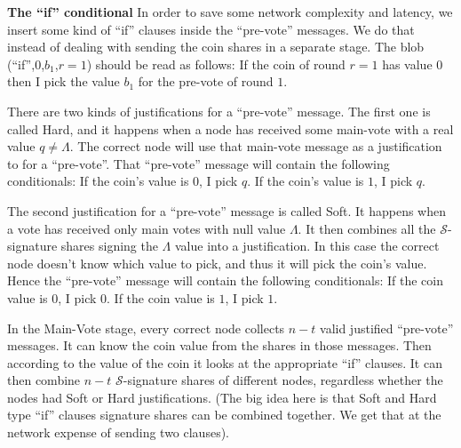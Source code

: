 \textbf{The ``if'' conditional}
In order to save some network complexity and latency, we insert some kind of
``if'' clauses inside the ``pre-vote'' messages. We do that instead of dealing
with sending the coin shares in a separate stage. The blob
(``if'',$0$,$b_1$,$r=1$) should be read as follows: If the coin of round $r=1$
has value $0$ then I pick the value $b_1$ for the pre-vote of round $1$.

There are two kinds of justifications for a ``pre-vote'' message. The first one
is called Hard, and it happens when a node has received some main-vote with a
real value $q \neq \Lambda$. The correct node will use that main-vote message
as a justification to for a ``pre-vote''. That ``pre-vote'' message will
contain the following conditionals: If the coin's value is $0$, I pick $q$. If
the coin's value is $1$, I pick $q$.

The second justification for a ``pre-vote'' message is called Soft. It happens
when a vote has received only main votes with null value $\Lambda$. It then
combines all the $\mathcal{S}$-signature shares signing the $\Lambda$ value into
a justification. In this case the correct node doesn't know which value to pick,
and thus it will pick the coin's value. Hence the ``pre-vote'' message will
contain the following conditionals: If the coin value is $0$, I pick $0$. If the
coin value is $1$, I pick $1$.

In the Main-Vote stage, every correct node collects $n-t$ valid justified
``pre-vote'' messages. It can know the coin value from the shares in those
messages. Then according to the value of the coin it looks at the appropriate
``if'' clauses. It can then combine $n-t$ $\mathcal{S}$-signature shares of
different nodes, regardless whether the nodes had Soft or Hard justifications.
(The big idea here is that Soft and Hard type ``if'' clauses signature shares
can be combined together. We get that at the network expense of sending two
clauses).

